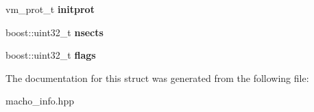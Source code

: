 \begin{DoxyCompactItemize}
\item 
vm\+\_\+prot\+\_\+t {\bfseries initprot}\hypertarget{a00265_af2f3f91f984cd716e60cb4dc76fbcbc0}{}\label{a00265_af2f3f91f984cd716e60cb4dc76fbcbc0}

\item 
boost\+::uint32\+\_\+t {\bfseries nsects}\hypertarget{a00265_af161f4ec9bffd02131f5d6cc48bd34ba}{}\label{a00265_af161f4ec9bffd02131f5d6cc48bd34ba}

\item 
boost\+::uint32\+\_\+t {\bfseries flags}\hypertarget{a00265_a8c8820a89a1a3e795fafd568a9b16b5a}{}\label{a00265_a8c8820a89a1a3e795fafd568a9b16b5a}

\end{DoxyCompactItemize}


The documentation for this struct was generated from the following file\+:\begin{DoxyCompactItemize}
\item 
macho\+\_\+info.\+hpp\end{DoxyCompactItemize}
